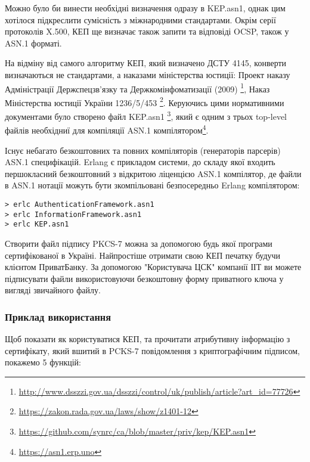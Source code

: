 Можно було би винести необхідні визначення одразу в KEP.asn1,
однак цим хотілося підкреслити сумісність з міжнародними стандартами. Окрім серії
протоколів X.500, КЕП ще визначає також запити та відповіді OCSP, також у ASN.1 форматі.

На відміну від самого алгоритму КЕП, який визначено ДСТУ 4145,
конверти визначаються не стандартами, а наказами міністерства юстиції:
Проект наказу Адміністрації Держспецзв'язку та Держкомінфоматизації (2009) \footnote{\url{http://www.dsszzi.gov.ua/dsszzi/control/uk/publish/article?art\_id=77726}},
Наказ Міністерства юстиції України 1236/5/453 \footnote{\url{https://zakon.rada.gov.ua/laws/show/z1401-12}}.
Керуючись цими нормативними документами було створено файл KEP.asn1 \footnote{\url{https://github.com/synrc/ca/blob/master/priv/kep/KEP.asn1}},
який є одним з трьох top-level файлів необхідниї для компіляції ASN.1 компілятором\footnote{\url{https://asn1.erp.uno}}.

Існує небагато безкоштовних та повних компіляторів (генераторів парсерів)
ASN.1 специфікацій. Erlang є прикладом системи, до складу якої входить
першокласний безкоштовний з відкритою ліценцією ASN.1 компілятор, де
файли в ASN.1 нотації можуть бути зкомпільовані безпосередньо Erlang компілятором:

\renewcommand{\footnotesize}{\normal}

\begin{lstlisting}
> erlc AuthenticationFramework.asn1
> erlc InformationFramework.asn1
> erlc KEP.asn1
\end{lstlisting}

Створити файл підпису PKCS-7 можна за допомогою будь якої програми сертифікованої в Україні.
Найпростіше отримати свою КЕП печатку будучи клієнтом ПриватБанку. За допомогою
"Користувача ЦСК" компанії ІІТ ви можете підписувати файли використовуючи безкоштовну
форму приватного ключа у вигляді звичайного файлу.

\newpage
\subsubsection{Приклад використання}

Щоб показати як користуватися КЕП, та прочитати атрибутивну інформацію з сертифікату,
який вшитий в PCKS-7 повідомлення з криптографічним підписом, покажемо 5 функцій:

\renewcommand{\footnotesize}{\tiny}

